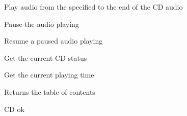 Play audio from the specified to the end of the CD audio



\label{wxcdaudiopause}


Pause the audio playing


\label{wxcdaudioresume}


Resume a paused audio playing


\label{wxcdaudiogetstatus}


Get the current CD status


\label{wxcdaudiogettime}


Get the current playing time


\label{wxcdaudiogettoc}


Returns the table of contents


\label{wxcdaudiook}


CD ok

